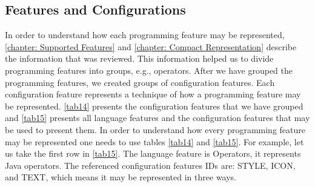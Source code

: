 \subsection{Features and Configurations}
In order to understand how each programming feature may be represented, \autoref{chapter: Supported Features} and \autoref{chapter: Compact Representation} describe the information that was reviewed. This information helped us to divide programming features into groups, e.g., operators. After we have grouped the programming features, we created groups of configuration features. Each configuration feature represents a technique of how a programming feature may be represented.
\autoref{tab14} presents the configuration features that we have grouped and \autoref{tab15} presents all language features and the configuration features that may be used to present them. In order to understand how every programming feature may be represented one needs to use tables \ref{tab14} and \ref{tab15}. For example, let us take the first row in \autoref{tab15}. The language feature is Operators, it represents Java operators. The referenced configuration features IDs are: STYLE, ICON, and TEXT, which means it may be represented in three ways.
